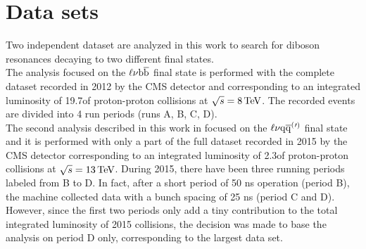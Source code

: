 
\section{Data sets}

Two independent dataset are analyzed in this work to search for diboson resonances decaying to two different final states.\\

The analysis focused on the $\ell\nu{\mathrm{b}\overline{\mathrm{b}}}$ final state is performed with the complete dataset recorded in 2012 by the CMS detector
and corresponding to an integrated luminosity of 19.7\fbinv of proton-proton collisions at $\sqrt{s} = 8\,\text{Te\hspace{-.08em}V}$.
The recorded events are divided into 4 run periods (runs A, B, C, D).\\

The second analysis described in this work in focused on the $\ell\nu\mathrm{q}\overline{\mathrm{q}}^({}'^){}$ final state and it is performed with only a part of the full dataset recorded in 2015 by the CMS detector
corresponding to an integrated luminosity of 2.3\fbinv of proton-proton collisions at $\sqrt{s} = 13\,\text{Te\hspace{-.08em}V}$.
During 2015, there have been three running periods labeled from B to D. In fact, after a short period of 50 ns operation (period B), the machine collected data with a bunch spacing of 25 ns (period C and D).
However, since the first two periods only add a tiny contribution to the total integrated luminosity of 2015 collisions, the decision was made to base the analysis on period D only, corresponding to the largest data set.\\

